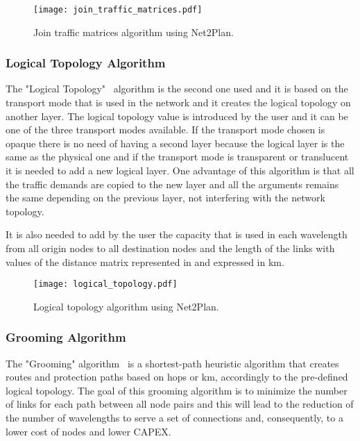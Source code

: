 \begin{figure}[H]
\centering
\texttt{[image: join\_traffic\_matrices.pdf]}
\caption{Join traffic matrices algorithm using Net2Plan.}
\label{join_traffic_matrices}
\end{figure}

\subsubsection{Logical Topology Algorithm}\label{logical_topology_algorithm}

\vspace{11pt}
The "Logical Topology" \ algorithm is the second one used and it is based on the transport mode that is used in the network and it creates the logical topology on another layer. The logical topology value is introduced by the user and it can be one of the three transport modes available. If the transport mode chosen is opaque there is no need of having a second layer because the logical layer is the same as the physical one and if the transport mode is transparent or translucent it is needed to add a new logical layer. One advantage of this algorithm is that all the traffic demands are copied to the new layer and all the arguments remains the same depending on the previous layer, not interfering with the network topology.

It is also needed to add by the user the capacity that is used in each wavelength from all origin nodes to all destination nodes and the length of the links with values of the distance matrix represented in \label{Reference_Network_Topology} and expressed in km.

\begin{figure}[h!]
\centering
\texttt{[image: logical\_topology.pdf]}
\caption{Logical topology algorithm using Net2Plan.}
\label{logical_topology}
\end{figure}

\subsubsection{Grooming Algorithm}\label{grooming_algorithm}

\vspace{11pt}
The "Grooming" algorithm \ is a shortest-path heuristic algorithm that creates routes and protection paths based on hops or km, accordingly to the pre-defined logical topology. The goal of this grooming algorithm is to minimize the number of links for each path between all node pairs and this will lead to the reduction of the number of wavelengths to serve a set of connections and, consequently, to a lower cost of nodes and lower CAPEX.


